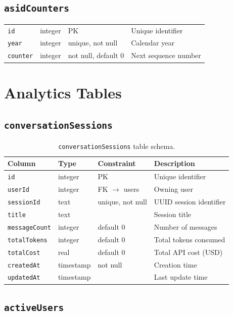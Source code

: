 \subsection{\texttt{asidCounters}}

\begin{tabular}{lllp{4cm}}
\toprule
\texttt{id} & integer & PK & Unique identifier \\
\texttt{year} & integer & unique, not null & Calendar year \\
\texttt{counter} & integer & not null, default 0 & Next sequence number \\
\bottomrule
\end{tabular}

\section{Analytics Tables}
\label{sec:schema:analytics}

\subsection{\texttt{conversationSessions}}

\begin{longtable}{lllp{4cm}}
\caption{\texttt{conversationSessions} table schema.} \label{tab:schema-sessions} \\
\toprule
\textbf{Column} & \textbf{Type} & \textbf{Constraint} & \textbf{Description} \\
\midrule
\endfirsthead
\texttt{id} & integer & PK & Unique identifier \\
\texttt{userId} & integer & FK $\to$ users & Owning user \\
\texttt{sessionId} & text & unique, not null & UUID session identifier \\
\texttt{title} & text & & Session title \\
\texttt{messageCount} & integer & default 0 & Number of messages \\
\texttt{totalTokens} & integer & default 0 & Total tokens consumed \\
\texttt{totalCost} & real & default 0 & Total API cost (USD) \\
\texttt{createdAt} & timestamp & not null & Creation time \\
\texttt{updatedAt} & timestamp & & Last update time \\
\bottomrule
\end{longtable}

\subsection{\texttt{activeUsers}}

